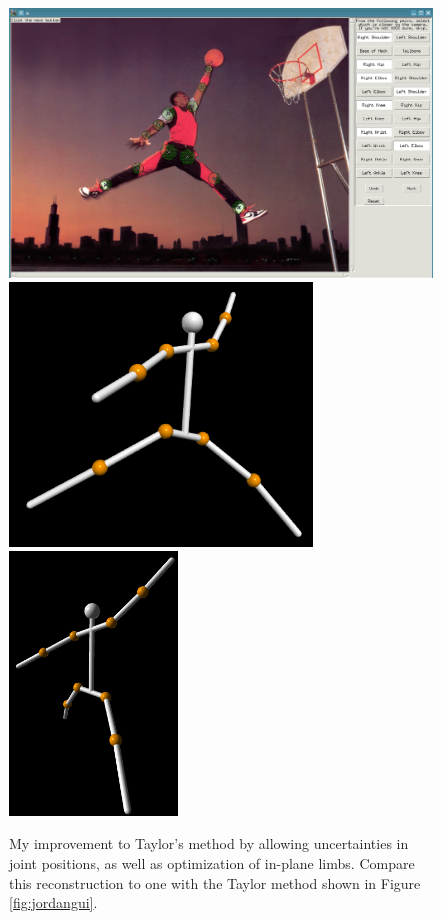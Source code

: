 \documentclass[final]{article}
\begin{document}
\begin{spacing}{1.1}
\begin{figure}[h]
  \centering
  \includegraphics[width=12cm]{fig/myjordan.png}
  \includegraphics[height=7cm]{fig/myjordanrecons.png}
  \includegraphics[height=7cm]{fig/myjordanrecons2.png}
  \caption{My improvement to Taylor's method by allowing uncertainties in joint positions, as well as optimization of in-plane limbs. Compare this reconstruction to one with the Taylor method shown in Figure \ref{fig:jordangui}.}
  \label{fig:myjordan}
\end{figure}


\end{spacing}
\end{document}
